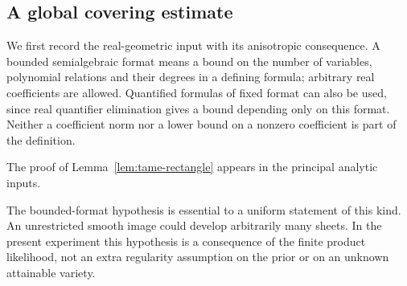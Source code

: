 \subsection{A global covering estimate}
We first record the real-geometric input with its anisotropic consequence.
A bounded semialgebraic format means a bound on the number of variables,
polynomial relations and their degrees in a defining formula; arbitrary
real coefficients are allowed. Quantified formulas of fixed format can
also be used, since real quantifier elimination gives a bound depending
only on this format. Neither a coefficient norm nor a lower bound on a
nonzero coefficient is part of the definition.

The proof of Lemma~\ref{lem:tame-rectangle} appears in the principal analytic inputs.

The bounded-format hypothesis is essential to a uniform statement of
this kind. An unrestricted smooth image could develop arbitrarily many
sheets. In the present experiment this hypothesis is a consequence of
the finite product likelihood, not an extra regularity assumption on the
prior or on an unknown attainable variety.

